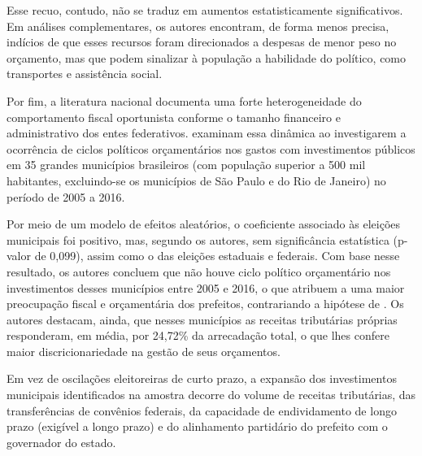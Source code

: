 Esse recuo, contudo, não se traduz em aumentos estatisticamente significativos. Em análises complementares, os autores encontram, de forma menos precisa, indícios de que esses recursos foram direcionados a despesas de menor peso no orçamento, mas que podem sinalizar à população a habilidade do político, como transportes e assistência social.

Por fim, a literatura nacional documenta uma forte heterogeneidade do comportamento fiscal oportunista conforme o tamanho financeiro e administrativo dos entes federativos. \textcite{gralak2023} examinam essa dinâmica ao investigarem a ocorrência de ciclos políticos orçamentários nos gastos com investimentos públicos em 35 grandes municípios brasileiros (com população superior a 500 mil habitantes, excluindo-se os municípios de São Paulo e do Rio de Janeiro) no período de 2005 a 2016.

Por meio de um modelo de efeitos aleatórios, o coeficiente associado às eleições municipais foi positivo, mas, segundo os autores, sem significância estatística (p-valor de 0,099), assim como o das eleições estaduais e federais. Com base nesse resultado, os autores concluem que não houve ciclo político orçamentário nos investimentos desses municípios entre 2005 e 2016, o que atribuem a uma maior preocupação fiscal e orçamentária dos prefeitos, contrariando a hipótese de \textcite{rogoff1990}. Os autores destacam, ainda, que nesses municípios as receitas tributárias próprias responderam, em média, por 24,72\% da arrecadação total, o que lhes confere maior discricionariedade na gestão de seus orçamentos.

Em vez de oscilações eleitoreiras de curto prazo, a expansão dos investimentos municipais identificados na amostra decorre do volume de receitas tributárias, das transferências de convênios federais, da capacidade de endividamento de longo prazo (exigível a longo prazo) e do alinhamento partidário do prefeito com o governador do estado.